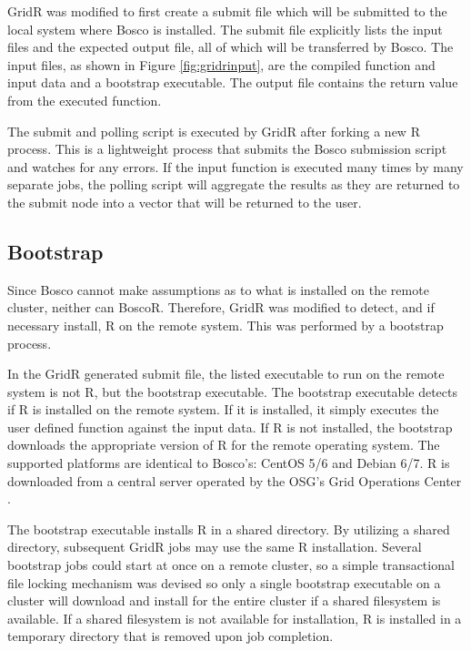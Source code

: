 GridR was modified to first create a submit file which will be submitted to the local system where Bosco is installed.  The submit file explicitly lists the input files and the expected output file, all of which will be transferred by Bosco.  The input files, as shown in Figure \ref{fig:gridrinput}, are the compiled function and input data and a bootstrap executable.  The output file contains the return value from the executed function.

The submit and polling script is executed by GridR after forking a new R process.  This is a lightweight process that submits the Bosco submission script and watches for any errors.  If the input function is executed many times by many separate jobs, the polling script will aggregate the results as they are returned to the submit node into a vector that will be returned to the user.  

\subsection{Bootstrap}
\label{sec:boscorbootstrap}

Since Bosco cannot make assumptions as to what is installed on the remote cluster, neither can BoscoR.  Therefore, GridR was modified to detect, and if necessary install, R on the remote system.  This was performed by a bootstrap process.

In the GridR generated submit file, the listed executable to run on the remote system is not R, but the bootstrap executable.  The bootstrap executable detects if R is installed on the remote system.  If it is installed, it simply executes the user defined function against the input data.  If R is not installed, the bootstrap downloads the appropriate version of R for the remote operating system.  The supported platforms are identical to Bosco's: CentOS 5/6 and Debian 6/7.  R is downloaded from a central server operated by the OSG's Grid Operations Center \cite{osgoperations}.  

The bootstrap executable installs R in a shared directory.  By utilizing a shared directory, subsequent GridR jobs may use the same R installation.  Several bootstrap jobs could start at once on a remote cluster, so a simple transactional file locking mechanism was devised so only a single bootstrap executable on a cluster will download and install for the entire cluster if a shared filesystem is available.  If a shared filesystem is not available for installation, R is installed in a temporary directory that is removed upon job completion.

